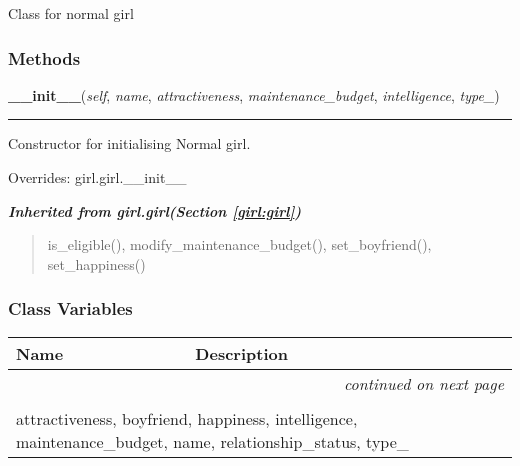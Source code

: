 Class for normal girl



  \subsubsection{Methods}

    \vspace{0.5ex}

\hspace{.8\funcindent}\begin{boxedminipage}{\funcwidth}

    \raggedright \textbf{\_\_init\_\_}(\textit{self}, \textit{name}, \textit{attractiveness}, \textit{maintenance\_budget}, \textit{intelligence}, \textit{type\_})

    \vspace{-1.5ex}

    \rule{\textwidth}{0.5\fboxrule}
\setlength{\parskip}{2ex}
    Constructor for initialising Normal girl.

\setlength{\parskip}{1ex}
      Overrides: girl.girl.\_\_init\_\_

    \end{boxedminipage}


\large{\textbf{\textit{Inherited from girl.girl\textit{(Section \ref{girl:girl})}}}}

\begin{quote}
is\_eligible(), modify\_maintenance\_budget(), set\_boyfriend(), set\_happiness()
\end{quote}


  \subsubsection{Class Variables}

    \vspace{-1cm}
\hspace{\varindent}\begin{longtable}{|p{\varnamewidth}|p{\vardescrwidth}|l}
\cline{1-2}
\cline{1-2} \centering \textbf{Name} & \centering \textbf{Description}& \\
\cline{1-2}
\endhead\cline{1-2}\multicolumn{3}{r}{\small\textit{continued on next page}}\\\endfoot\cline{1-2}
\endlastfoot\multicolumn{2}{|l|}{\textit{Inherited from girl.girl \textit{(Section \ref{girl:girl})}}}\\
\multicolumn{2}{|p{\varwidth}|}{\raggedright attractiveness, boyfriend, happiness, intelligence, maintenance\_budget, name, relationship\_status, type\_}\\
\cline{1-2}
\end{longtable}


